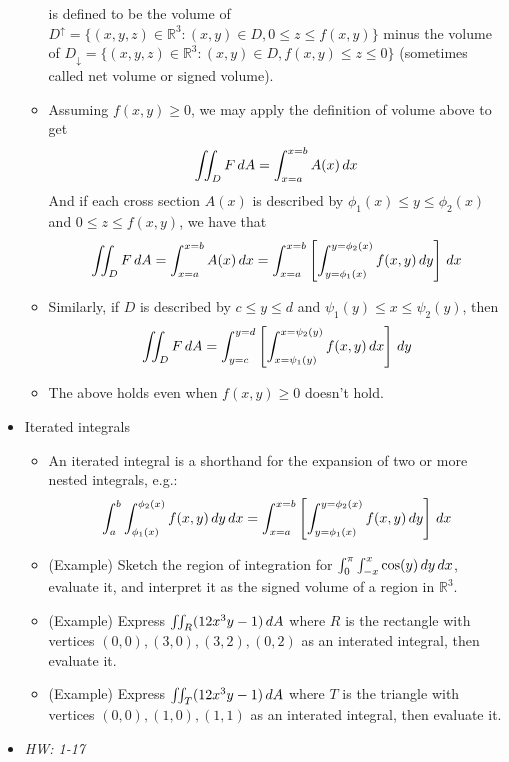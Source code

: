 \documentclass[11pt]{article}
\begin{document}
\begin{itemize}
\begin{itemize}
      is defined to be the volume of
      \(D^\uparrow=\{(x,y,z)\in\mathbb R^3:(x,y)\in D,0\leq z\leq f(x,y)\}\)
      minus the volume of
      \(D_\downarrow=\{(x,y,z)\in\mathbb R^3:(x,y)\in D,f(x,y)\leq z\leq 0\}\)
      (sometimes called net volume or signed volume).
      \item Assuming \(f(x,y)\geq 0\), we may apply the definition of volume
      above to get
        \[
          \iint_D F\,d A
            =
          \int_{x=a}^{x=b}
          A(x)
          \,d x
        \]
      And if each cross section \(A(x)\) is described by \(\phi_1(x)\leq y\leq\phi_2(x)\)
      and \(0\leq z\leq f(x,y)\),
      we have that
        \[
          \iint_D F\,d A
            =
          \int_{x=a}^{x=b}
          A(x)
          \,d x
            =
          \int_{x=a}^{x=b}
          \left[
          \int_{y=\phi_1(x)}^{y=\phi_2(x)}
          f(x,y) \,d y
          \right] \,d x
        \]
      \item Similarly, if \(D\) is described by \(c\leq y\leq d\) and
        \(\psi_1(y)\leq x\leq \psi_2(y)\), then
        \[
          \iint_D F\,d A
            =
          \int_{y=c}^{y=d}
          \left[
          \int_{x=\psi_1(y)}^{x=\psi_2(y)}
          f(x,y) \,d x
          \right] \,d y
        \]
      \item The above holds even when \(f(x,y)\geq 0\) doesn't hold.
    \end{itemize}
  \item Iterated integrals
    \begin{itemize}
      \item An iterated integral is a shorthand for the expansion of two
        or more nested integrals, e.g.:
        \[
          \int_a^b
          \int_{\phi_1(x)}^{\phi_2(x)}
          f(x,y)
          \,d y\,d x
            =
          \int_{x=a}^{x=b}
          \left[
          \int_{y=\phi_1(x)}^{y=\phi_2(x)}
          f(x,y) \,d y
          \right] \,d x
        \]
      \item (Example) Sketch the region of integration for
            \(\int_0^\pi\int_{-x}^x \cos(y)\,d y\,d x\),
            evaluate it,
            and interpret it as the signed volume of a region in \(\mathbb R^3\).
      \item (Example) Express \(\iint_R (12x^3y-1)\,d A\) where
            \(R\) is the
            rectangle with vertices \((0,0),(3,0),(3,2),(0,2)\)
            as an interated integral, then evaluate it.
      \item (Example) Express \(\iint_T (12x^3y-1)\,d A\) where
            \(T\) is the
            triangle with vertices \((0,0),(1,0),(1,1)\)
            as an interated integral, then evaluate it.
    \end{itemize}
  \item\textit{
    HW: 1-17
  }
\end{itemize}
\end{document}
